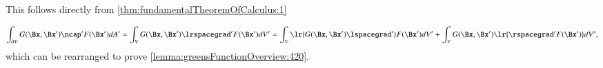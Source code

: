 This follows directly from \cref{thm:fundamentalTheoremOfCalculus:1}

\begin{dmath}\label{eqn:greensFunctionSolutions:440}
\int_{\partial V} G(\Bx, \Bx') \ncap' F(\Bx') dA'
=
\int_V G(\Bx, \Bx') \lrspacegrad' F(\Bx') dV'
=
\int_V \lr{ G(\Bx, \Bx') \lspacegrad' } F(\Bx') dV'
+
\int_V G(\Bx, \Bx') \lr{ \rspacegrad' F(\Bx') } dV',
\end{dmath}
which can be rearranged to prove \cref{lemma:greensFunctionOverview:420}.

